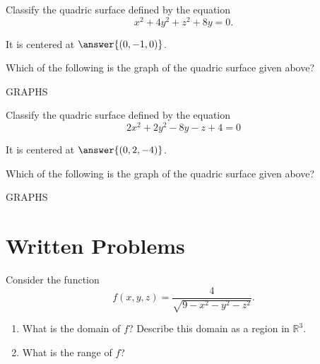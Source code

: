 \documentclass{ximera}
\begin{document}
\begin{problem}
Classify the quadric surface defined by the equation
\[
x^2 + 4y^2 + z^2 + 8y = 0.
\]

\begin{multipleChoice}
\end{multipleChoice}

It is centered at $\answer{(0,-1,0)}$.

\begin{problem}
Which of the following is the graph of the quadric surface given above?

GRAPHS
\end{problem}


\end{problem}

\begin{problem}
Classify the quadric surface defined by the equation
\[
2x^2 + 2y^2 - 8y - z + 4 = 0
\]

\begin{multipleChoice}
\end{multipleChoice}

It is centered at $\answer{(0,2,-4)}$.

\begin{problem}
Which of the following is the graph of the quadric surface given above?

GRAPHS
\end{problem}


\end{problem}

\section*{Written Problems}
\begin{problem}
Consider the function
\[
f(x,y,z) = \frac{4}{\sqrt{9-x^2-y^2-z^2}}.
\]
\begin{enumerate}
\item What is the domain of $f$? Describe this domain as a region in $\mathbb{R}^3$.
\item What is the range of $f$?
\end{enumerate}
\end{problem}
\end{document}
